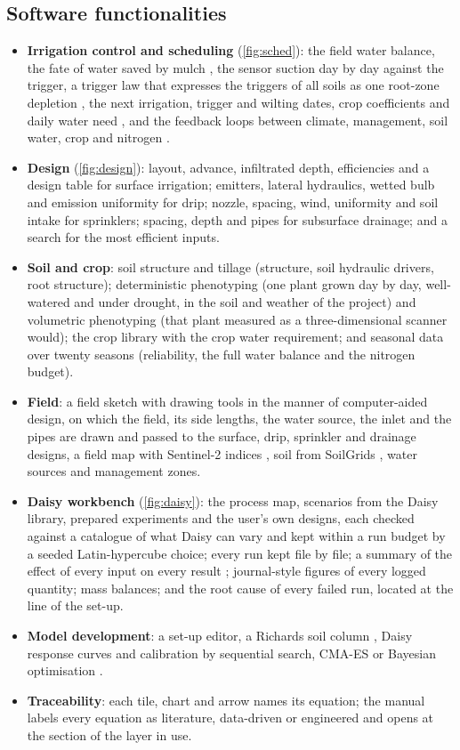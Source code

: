 \documentclass[preprint,12pt]{elsarticle}
\begin{document}
\subsection{Software functionalities}
\begin{itemize}[nosep]
\item \textbf{Irrigation control and scheduling} (\cref{fig:sched}): the field water balance, the fate of water saved by mulch \cite{BalwinderSingh2011,Vuaille2024}, the sensor suction day by day against the trigger, a trigger law that expresses the triggers of all soils as one root-zone depletion \cite{Allen1998}, the next irrigation, trigger and wilting dates, crop coefficients and daily water need \cite{Allen1998,Doorenbos1979}, and the feedback loops between climate, management, soil water, crop and nitrogen \cite{Seneviratne2010,Koster2004}.
\item \textbf{Design} (\cref{fig:design}): layout, advance, infiltrated depth, efficiencies and a design table for surface irrigation; emitters, lateral hydraulics, wetted bulb and emission uniformity for drip; nozzle, spacing, wind, uniformity and soil intake for sprinklers; spacing, depth and pipes for subsurface drainage; and a search for the most efficient inputs.
\item \textbf{Soil and crop}: soil structure and tillage (structure, soil hydraulic drivers, root structure); deterministic phenotyping (one plant grown day by day, well-watered and under drought, in the soil and weather of the project) and volumetric phenotyping (that plant measured as a three-dimensional scanner would); the crop library with the crop water requirement; and seasonal data over twenty seasons (reliability, the full water balance and the nitrogen budget).
\item \textbf{Field}: a field sketch with drawing tools in the manner of computer-aided design, on which the field, its side lengths, the water source, the inlet and the pipes are drawn and passed to the surface, drip, sprinkler and drainage designs, a field map with Sentinel-2 indices \cite{Drusch2012,Rouse1974,Huete2002}, soil from SoilGrids \cite{Poggio2021}, water sources and management zones.
\item \textbf{Daisy workbench} (\cref{fig:daisy}): the process map, scenarios from the Daisy library, prepared experiments and the user's own designs, each checked against a catalogue of what Daisy can vary and kept within a run budget by a seeded Latin-hypercube choice; every run kept file by file; a summary of the effect of every input on every result \cite{Saltelli2008}; journal-style figures of every logged quantity; mass balances; and the root cause of every failed run, located at the line of the set-up.
\item \textbf{Model development}: a set-up editor, a Richards soil column \cite{Celia1990}, Daisy response curves and calibration by sequential search, CMA-ES \cite{HansenOstermeier2001} or Bayesian optimisation \cite{Mockus1978}.
\item \textbf{Traceability}: each tile, chart and arrow names its equation; the manual labels every equation as literature, data-driven or engineered and opens at the section of the layer in use.
\end{itemize}
\end{document}
